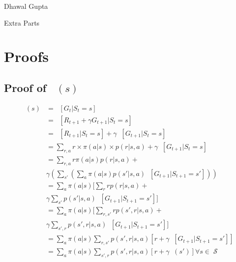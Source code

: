 \documentclass{article}
\DeclareMathOperator{\vp}{v_\pi} %
\DeclareMathOperator{\state}{\mathcal{S}}
\DeclareMathOperator{\E}{\mathds{E}}
\DeclareMathOperator{\Ep}{\E_\pi}
\begin{document}
\large %


{  %
\hfill Dhawal Gupta}

\begin{center}
Extra Parts\end{center}
\vspace{0.05in}

\section{Proofs}
\subsection{Proof of $\vp(s)$}
\begin{align*}
	\vp(s) &= \Ep[G_t | S_t = s] \\
	&= \Ep [R_{t+1} + \gamma G_{t+1} | S_t = s]\\
	&= \Ep[R_{t+1}  | S_t= s] + \gamma \Ep[G_{t+1} | S_t= s]\\
	&= \sum_{r,  a} r \times \pi(a|s) \times p(r|s,a) + \gamma  \Ep[G_{t+1} | S_t= s]\\
	&= \sum_{r,  a} r \pi(a|s)  p(r|s,a) +\\
	& \gamma  ( \sum_{s'}( \sum_a \pi(a|s)p(s'|s,a)  \Ep[G_{t+1} | S_{t+1} = s']))\\
	&= \sum_a \pi(a|s) [  \sum_r r p(r|s,a) + \\
	&\gamma \sum_{s'}p(s'|s,a) \Ep[G_{t+1} | S_{t+1} = s']  ]\\
	&= \sum_a \pi(a|s) [  \sum_{r,s'} r p(s',r|s,a) +\\
	& \gamma \sum_{s',r}p(s',r|s,a) \Ep[G_{t+1} | S_{t+1} = s']  ]\\
	&= \sum_a \pi(a|s) \sum_{r,s'} p(s',r|s,a)[ r + \gamma \Ep[G_{t+1} | S_{t+1} = s']  ]\\
	&= \sum_a \pi(a|s) \sum_{s',r} p(s',r|s,a) [r + \gamma \vp(s')] \forall s \in \state
\end{align*}
\end{document}
